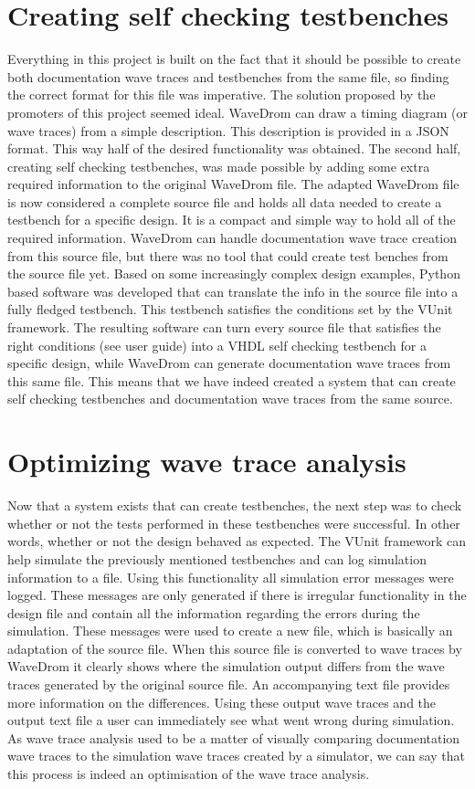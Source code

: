 \section{Creating self checking testbenches}
Everything in this project is built on the fact that it should be possible to create both documentation wave traces and testbenches from the same file, so finding the correct format for this file was imperative. The solution proposed by the promoters of this project seemed ideal. WaveDrom can draw a timing diagram (or wave traces) from a simple description. This description is provided in a JSON format. This way half of the desired functionality was obtained. The second half, creating self checking testbenches, was made possible by adding some extra required information to the original WaveDrom file. The adapted WaveDrom file is now considered a complete source file and holds all data needed to create a testbench for a specific design. It is a compact and simple way to hold all of the required information.
\npar
WaveDrom can handle documentation wave trace creation from this source file, but there was no tool that could create test benches from the source file yet. Based on some increasingly complex design examples, Python based software was developed that can translate the info in the source file into a fully fledged testbench. This testbench satisfies the conditions set by the VUnit framework.
\npar
The resulting software can turn every source file that satisfies the right conditions (see user guide) into a VHDL self checking testbench for a specific design, while WaveDrom can generate documentation wave traces from this same file. This means that we have indeed created a system that can create self checking testbenches and documentation wave traces from the same source.
\section{Optimizing wave trace analysis}
Now that a system exists that can create testbenches, the next step was to check whether or not the tests performed in these testbenches were successful. In other words, whether or not the design behaved as expected.
\npar
The VUnit framework can help simulate the previously mentioned testbenches and can log simulation information to a file. Using this functionality all simulation error messages were logged. These messages are only generated if there is irregular functionality in the design file and contain all the information regarding the errors during the simulation. These messages were used to create a new file, which is basically an adaptation of the source file. When this source file is converted to wave traces by WaveDrom it clearly shows where the simulation output differs from the wave traces generated by the original source file. An accompanying text file provides more information on the differences. Using these output wave traces and the output text file a user can immediately see what went wrong during simulation.
\npar
As wave trace analysis used to be a matter of visually comparing documentation wave traces to the simulation wave traces created by a simulator, we can say that this process is indeed an optimisation of the wave trace analysis.
